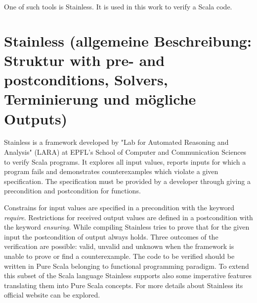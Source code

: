One of such tools is Stainless. It is used in this work to verify a Scala code.

 


\section{Stainless (allgemeine Beschreibung: Struktur with pre- and postconditions, Solvers, Terminierung und mögliche Outputs)}
\label{sec:stainless}


Stainless is a framework developed by "Lab for Automated Reasoning and Analysis" (LARA) at EPFL's School of Computer and Communication Sciences to verify Scala programs.
It explores all input values, reports inputs for which a program fails and demonstrates counterexamples which violate a given specification.
The specification must be provided by a developer through giving a precondition and postcondition for functions. 

Constrains for input values are specified in a precondition with the keyword \textit{require}. 
Restrictions for received output values are defined in a postcondition with the keyword \textit{ensuring}. 
While compiling Stainless tries to prove that for the given input the postcondition of output always holds.
Three outcomes of the verification are possible: valid, unvalid and unknown when the framework is unable to prove or find a counterexample.
The code to be verified should be written in Pure Scala belonging to functional programming paradigm. To extend this subset of the Scala language Stainless supports also some imperative features translating them into Pure Scala concepts.
For more details about Stainless its official website can be explored. \cite{Stainless}



